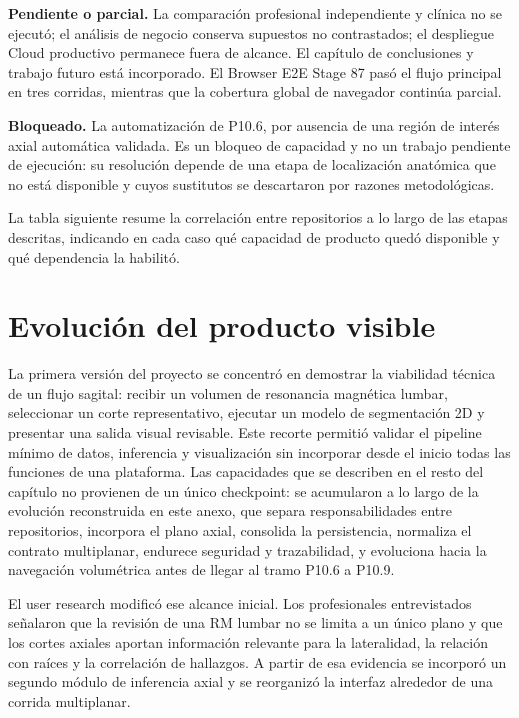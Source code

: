 \textbf{Pendiente o parcial.} La comparación profesional independiente y clínica no se ejecutó; el análisis de negocio conserva supuestos no contrastados; el despliegue Cloud productivo permanece fuera de alcance. El capítulo de conclusiones y trabajo futuro está incorporado. El Browser E2E Stage 87 pasó el flujo principal en tres corridas, mientras que la cobertura global de navegador continúa parcial.

\textbf{Bloqueado.} La automatización de P10.6, por ausencia de una región de interés axial automática validada. Es un bloqueo de capacidad y no un trabajo pendiente de ejecución: su resolución depende de una etapa de localización anatómica que no está disponible y cuyos sustitutos se descartaron por razones metodológicas.

La tabla siguiente resume la correlación entre repositorios a lo largo de las etapas descritas, indicando en cada caso qué capacidad de producto quedó disponible y qué dependencia la habilitó.

\section{Evolución del producto visible}
\label{anexo:f-evolucion-producto-visible}

La primera versión del proyecto se concentró en demostrar la viabilidad técnica de un flujo sagital: recibir un volumen de resonancia magnética lumbar, seleccionar un corte representativo, ejecutar un modelo de segmentación 2D y presentar una salida visual revisable. Este recorte permitió validar el pipeline mínimo de datos, inferencia y visualización sin incorporar desde el inicio todas las funciones de una plataforma. Las capacidades que se describen en el resto del capítulo no provienen de un único checkpoint: se acumularon a lo largo de la evolución reconstruida en este anexo, que separa responsabilidades entre repositorios, incorpora el plano axial, consolida la persistencia, normaliza el contrato multiplanar, endurece seguridad y trazabilidad, y evoluciona hacia la navegación volumétrica antes de llegar al tramo P10.6 a P10.9.

El user research modificó ese alcance inicial. Los profesionales entrevistados señalaron que la revisión de una RM lumbar no se limita a un único plano y que los cortes axiales aportan información relevante para la lateralidad, la relación con raíces y la correlación de hallazgos. A partir de esa evidencia se incorporó un segundo módulo de inferencia axial y se reorganizó la interfaz alrededor de una corrida multiplanar.

